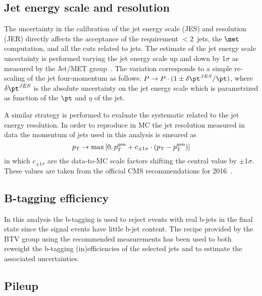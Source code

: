 \subsection{Jet energy scale and resolution}

The uncertainty in the calibration of the jet energy scale (JES) and resolution (JER) 
directly affects the acceptance of the requirement $< 2$~jets, 
the $\met$ computation, and all the cuts related to jets. 
The estimate of the jet energy scale uncertainty is performed varying 
the jet energy scale up and down by 1$\sigma$ as
measured by the Jet/MET group~\cite{twiki:JES}. The variation
corresponds to a simple re-scaling of the jet four-momentum as
follows: $P\rightarrow P \cdot (1 \pm \delta\pt^{JES}/{\pt})$, where 
$\delta\pt^{JES}$ is the absolute uncertainty on the jet energy scale
which is parametrized as function of the $\pt$ and $\eta$ of the jet. 

A similar strategy is performed to evaluate the systematic related to
the jet energy resolution. In order to reproduce in MC the jet
resolution measured in data the momentum of jets used in this 
analysis is smeared as 
\begin{equation}
p_{\rm T} \rightarrow \max \left[0 , p_{T}^{\rm gen} + c_{\pm1\sigma}\cdot (p_{\rm T}-p_{\rm T}^{\rm gen}) \right]
\end{equation}
in which $c_{\pm1\sigma}$ are the data-to-MC scale factors 
shifting the central value by $\pm$1$\sigma$. These values are taken 
from the official CMS recommendations for 2016~\cite{twiki:JES}.

\subsection{B-tagging efficiency}

In this analysis the b-tagging is used to reject events with real b-jets in the final state since the signal events have little b-jet content. The recipe provided by the BTV group using the recommended measurements has been used to both reweight the b-tagging (in)efficiencies of the selected jets and to estimate 
the associated uncertainties.

\subsection{Pileup}

